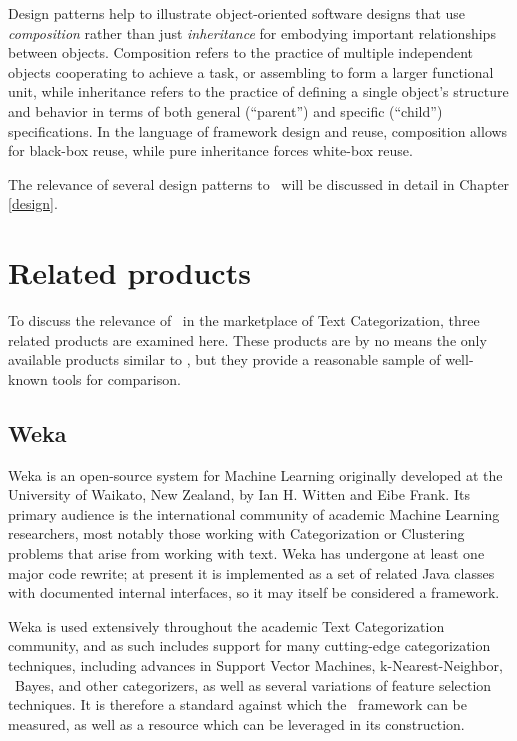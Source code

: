 Design patterns help to illustrate object-oriented software designs
that use \emph{composition} rather than just \emph{inheritance} for
embodying important relationships between objects.  Composition refers
to the practice of multiple independent objects cooperating to achieve
a task, or assembling to form a larger functional unit, while
inheritance refers to the practice of defining a single object's
structure and behavior in terms of both general (``parent'') and
specific (``child'') specifications.  In the language of framework
design and reuse, composition allows for black-box reuse, while pure
inheritance forces white-box reuse.\cite[p. 19]{gamma:95}

The relevance of several design patterns to \aicat\ will be discussed
in detail in Chapter \ref{design}.

\section{Related products}

To discuss the relevance of \aicat\ in the marketplace of Text
Categorization, three related products are examined here.  These
products are by no means the only available products similar to
\aicat, but they provide a reasonable sample of well-known tools for
comparison.

\subsection{Weka}

Weka is an open-source system for Machine Learning originally
developed at the University of Waikato, New Zealand, by Ian H. Witten
and Eibe Frank.\cite{weka:99} Its primary
audience is the international community of academic Machine Learning
researchers, most notably those working with Categorization or
Clustering problems that arise from working with text.  Weka has
undergone at least one major code rewrite; at present it is
implemented as a set of related Java classes with documented internal
interfaces, so it may itself be considered a framework.

Weka is used extensively throughout the academic Text Categorization
community, and as such includes support for many cutting-edge
categorization techniques, including advances in Support Vector
Machines, k-Nearest-Neighbor, \naive\ Bayes, and other categorizers, as
well as several variations of feature selection techniques.  It is
therefore a standard against which the \aicat\ framework can
be measured, as well as a resource which can be leveraged in its
construction.

